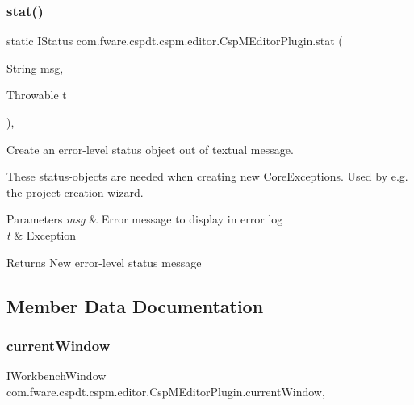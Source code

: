 \subsubsection{\texorpdfstring{stat()}{stat()}\hspace{0.1cm}{\footnotesize\ttfamily [2/2]}}
{\footnotesize\ttfamily static I\+Status com.\+fware.\+cspdt.\+cspm.\+editor.\+Csp\+M\+Editor\+Plugin.\+stat (\begin{DoxyParamCaption}\item[{String}]{msg,  }\item[{Throwable}]{t }\end{DoxyParamCaption})\hspace{0.3cm}{\ttfamily [inline]}, {\ttfamily [static]}}



Create an error-\/level status object out of textual message. 

These status-\/objects are needed when creating new Core\+Exceptions. Used by e.\+g. the project creation wizard.


\begin{DoxyParams}{Parameters}
{\em msg} & Error message to display in error log \\
\hline
{\em t} & Exception \\
\hline
\end{DoxyParams}
\begin{DoxyReturn}{Returns}
New error-\/level status message 
\end{DoxyReturn}


\subsection{Member Data Documentation}
\mbox{\label{classcom_1_1fware_1_1cspdt_1_1cspm_1_1editor_1_1_csp_m_editor_plugin_a00372fb921d6f5cc3ee5b79bb1fa065a}} 
\subsubsection{\texorpdfstring{current\+Window}{currentWindow}}
{\footnotesize\ttfamily I\+Workbench\+Window com.\+fware.\+cspdt.\+cspm.\+editor.\+Csp\+M\+Editor\+Plugin.\+current\+Window\hspace{0.3cm}{\ttfamily [static]}, {\ttfamily [protected]}}



